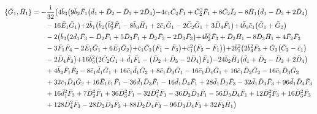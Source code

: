\documentclass[10pt]{amsart}
\theoremstyle{definition}
\theoremstyle{corollary}
\theoremstyle{remark}
\theoremstyle{conclusion}
\begin{document}
\begin{align}
\{\bar{G}_1, \bar{H}_1\}&=-\frac{{\rm i}}{32}  \bigl(4 \bar{b}_3 \bigl(9 \bar{b}_2 \bar{F}_1\bigl(\bar{d}_1+\bar{D}_2-\bar{D}_3+2 \bar{D}_4\bigl)-4 \bar{c}_1 \bar{C}_2 \bar{F}_1+\bar{C}_2^2 \bar{F}_1+8 \bar{C}_2 \bar{I}_2-8 \bar{H}_1 \bigl(\bar{d}_1-\bar{D}_3+2 \bar{D}_4\bigl) \nonumber \\
& \hskip 0.7cm-16 \bar{E}_1 \bar{G}_1\bigl)+2 \bar{b}_1 \bigl(\bar{b}_2 \bigl(\bar{b}_3^2 \bar{F}_1-8 \bar{b}_3 \bar{H}_1+2 \bar{c}_1 \bar{G}_1-2 \bar{C}_2 \bar{G}_1+3 \bar{D}_4 \bar{F}_1\bigl)+4 \bar{b}_3 \bar{c}_1 \bigl(\bar{G}_1+\bar{G}_2\bigl) \nonumber \\
& \hskip 0.7cm-2 \bigl(\bar{b}_3 \bigl(2 \bar{d}_1 \bar{F}_3-\bar{D}_2 \bar{F}_1+5 \bar{D}_3 \bar{F}_1+\bar{D}_2 \bar{F}_3-2 \bar{D}_3 \bar{F}_3\bigl)+4 \bar{b}_3^3 \bar{F}_3+\bar{D}_2 \bar{H}_1-8 \bar{D}_3 \bar{H}_1+4 \bar{F}_2 \bar{F}_3 \nonumber \\
& \hskip 0.7cm-3 \bar{F}_1 \bar{F}_4-2 \bar{E}_1 \bar{G}_1+6 \bar{E}_1 \bar{G}_2\bigl)+\bar{c}_1 \bar{C}_2 \bigl(\bar{F}_1-\bar{F}_3\bigl)+\bar{c}_1^2 \bigl(\bar{F}_3-\bar{F}_1\bigl)\bigl)+2 \bar{b}_1^2 \bigl(2 \bar{b}_3^2 \bar{F}_3+\bar{G}_2 \bigl(\bar{C}_2-\bar{c}_1\bigl) \nonumber \\
& \hskip 0.7cm-2 \bar{D}_4 \bar{F}_3\bigl)+16 \bar{b}_3^2 \bigl(2 \bar{C}_2 \bar{G}_1+\bar{d}_1 \bar{F}_1-\bigl(\bar{D}_2+\bar{D}_3-2 \bar{D}_4\bigl) \bar{F}_1\bigl)-24 \bar{b}_2 \bar{H}_1 \bigl(\bar{d}_1+\bar{D}_2-\bar{D}_3+2 \bar{D}_4\bigl)\nonumber \\
& \hskip 0.7cm+4 \bar{b}_2 \bar{F}_1 \bar{F}_2-8 \bar{c}_1 \bar{d}_1 \bar{G}_1+16 \bar{c}_1 \bar{d}_1 \bar{G}_2+8 \bar{c}_1 \bar{D}_3 \bar{G}_1-16 \bar{c}_1 \bar{D}_4 \bar{G}_1+16 \bar{c}_1 \bar{D}_2 \bar{G}_2-16 \bar{c}_1 \bar{D}_3 \bar{G}_2\nonumber \\
& \hskip 0.7cm+32 \bar{c}_1 \bar{D}_4 \bar{G}_2+16 \bar{E}_1 \bar{c}_1 \bar{F}_1-36 \bar{d}_1 \bar{D}_3 \bar{F}_1-16 \bar{d}_1 \bar{D}_4 \bar{F}_1+28 \bar{d}_1 \bar{D}_2 \bar{F}_3-32 \bar{d}_1 \bar{D}_3 \bar{F}_3+96 \bar{d}_1 \bar{D}_4 \bar{F}_3\nonumber \\
& \hskip 0.7cm+16 \bar{d}_1^2 \bar{F}_3+7 \bar{D}_2^2 \bar{F}_1+36 \bar{D}_3^2 \bar{F}_1-32 \bar{D}_4^2 \bar{F}_1-36 \bar{D}_2 \bar{D}_3 \bar{F}_1-56 \bar{D}_3 \bar{D}_4 \bar{F}_1+12 \bar{D}_2^2 \bar{F}_3+16 \bar{D}_3^2 \bar{F}_3\nonumber \\
& \hskip 0.7cm+128 \bar{D}_4^2 \bar{F}_3-28 \bar{D}_2 \bar{D}_3 \bar{F}_3+88 \bar{D}_2 \bar{D}_4 \bar{F}_3-96 \bar{D}_3 \bar{D}_4 \bar{F}_3+32 \bar{F}_2 \bar{H}_1\bigl)\, \nonumber \\

\end{align}
\end{document}
